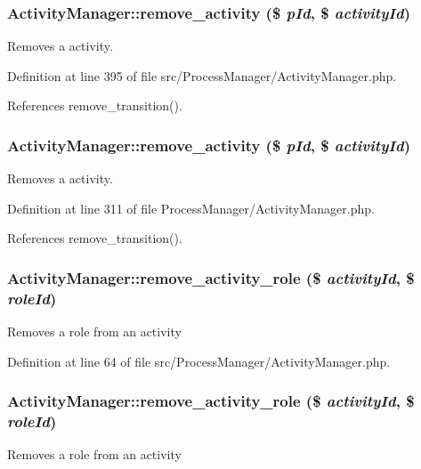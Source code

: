 \subsubsection{\setlength{\rightskip}{0pt plus 5cm}Activity\-Manager::remove\_\-activity (\$ {\em p\-Id}, \$ {\em activity\-Id})}\label{classActivityManager_a33}


Removes a activity. 

Definition at line 395 of file src/Process\-Manager/Activity\-Manager.php.

References remove\_\-transition().
\subsubsection{\setlength{\rightskip}{0pt plus 5cm}Activity\-Manager::remove\_\-activity (\$ {\em p\-Id}, \$ {\em activity\-Id})}\label{classActivityManager_a14}


Removes a activity. 

Definition at line 311 of file Process\-Manager/Activity\-Manager.php.

References remove\_\-transition().
\subsubsection{\setlength{\rightskip}{0pt plus 5cm}Activity\-Manager::remove\_\-activity\_\-role (\$ {\em activity\-Id}, \$ {\em role\-Id})}\label{classActivityManager_a20}


Removes a role from an activity 

Definition at line 64 of file src/Process\-Manager/Activity\-Manager.php.
\subsubsection{\setlength{\rightskip}{0pt plus 5cm}Activity\-Manager::remove\_\-activity\_\-role (\$ {\em activity\-Id}, \$ {\em role\-Id})}\label{classActivityManager_a4}


Removes a role from an activity 

